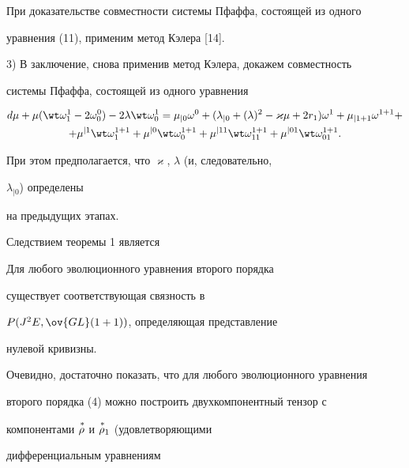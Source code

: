 При доказательстве совместности системы Пфаффа, состоящей из одного 


уравнения (11), применим метод Кэлера [14].


 


3) В заключение, снова применив метод Кэлера, докажем совместность 


системы Пфаффа, состоящей из одного уравнения 


\begin{gather*} 


d\mu+\mu(\wt\omega^1_1-2\omega^0_0)-2\lambda\wt\omega^1_0= 


\mu_{|0}\omega^0+(\lambda_{|0}+(\lambda)^2-\varkappa\mu+ 


2r_1)\omega^1+\mu_{|1+1}\omega^{1+1}+ \\


+\mu^{|1}\wt\omega^{1+1}_1+\mu^{|0}\wt\omega^{1+1}_0+ 


\mu^{|11}\wt\omega^{1+1}_{11}+\mu^{|01}\wt\omega^{1+1}_{01}. 


\end{gather*}  


При этом предполагается, что $\varkappa$, $\lambda$ (и, следовательно, 


$\lambda_{|0}$) определены 


на предыдущих этапах.





Следствием теоремы 1 является 


 


\begin{thm} Для любого эволюционного уравнения второго порядка 


существует соответствующая связность в 


$P(J^2 E,\ov{GL}(1+1))$, определяющая представление 


нулевой кривизны. 


\end{thm} 


 


Очевидно, достаточно показать, что для любого эволюционного уравнения 


второго порядка (4) можно построить двухкомпонентный тензор с 


компонентами $\overset{\,*}{\rho}{}$ и $\overset{\,*}{\rho}{}_1$ (удовлетворяющими 


дифференциальным уравнениям 


